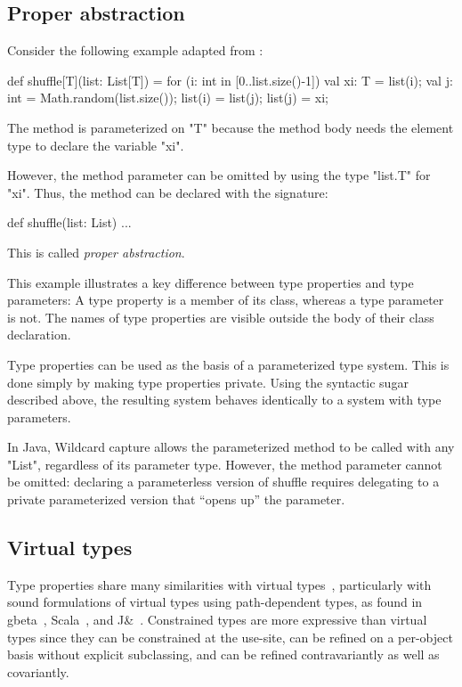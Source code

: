 \documentclass[preprint,nocopyrightspace,9pt]{sigplanconf}
\begin{document}
\subsection{Proper abstraction}

Consider the following example adapted from \cite{adding-wildcards}:
\begin{xten}
def shuffle[T](list: List[T]) = {
    for (i: int in [0..list.size()-1]) {
        val xi: T = list(i);
        val j: int = Math.random(list.size());
        list(i) = list(j);
        list(j) = xi;
    }
}
\end{xten}
The method is parameterized on \xcd"T" because the method body needs
the element type to declare the variable \xcd"xi".

However, the method parameter can be omitted by using the type \xcd"list.T"
for \xcd"xi".  Thus, the method can be declared with the signature:
\begin{xten}
def shuffle(list: List) { ... }
\end{xten}
This is called \emph{proper abstraction}.

This example illustrates a key difference between type properties
and type parameters:
A type property is a member of its class, whereas a type parameter is
not.  The names of type properties are visible outside the body of
their class declaration.

Type properties can be used as the basis of a parameterized type
system.  This is done simply by making type properties private.
Using the syntactic sugar described above,
the resulting system behaves identically to a system with type
parameters.
\fi

In Java,
Wildcard
capture allows the parameterized method to be called with any \xcd"List",
regardless of its parameter type.
However,
the method parameter cannot be omitted: declaring a parameterless version
of shuffle requires delegating to a private parameterized version that
``opens up'' the parameter.

\subsection{Virtual types}

Type properties share many similarities with virtual types~\cite{mp89-virtual-classes,beta}, particularly
with sound formulations of virtual types using path-dependent types,
as found in gbeta~\cite{ernst99-gbeta}, Scala~\cite{scala},
and J\&~\cite{nqm06}.
%
Constrained types are more expressive than virtual
types since they can be constrained at the use-site,
can be refined on a per-object basis without explicit subclassing,
and can be refined contravariantly
as well as covariantly.
\end{document}
